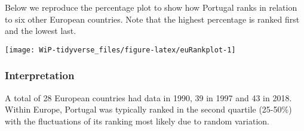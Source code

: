 \documentclass[a4paper,9pt,twocolumn,twoside,printwatermark=false]{pinp}
\begin{document}
Below we reproduce the percentage plot to show how Portugal ranks in
relation to six other European countries. Note that the highest
percentage is ranked first and the lowest last.

\begin{Shaded}
\end{Shaded}

\begin{center}\texttt{[image: WiP-tidyverse\_files/figure-latex/euRankplot-1]} \end{center}

\hypertarget{interpretation-4}{%
\subsubsection{Interpretation}\label{interpretation-4}}

A total of 28 European countries had data in 1990, 39 in 1997 and 43 in
2018. Within Europe, Portugal was typically ranked in the second
quartile (25-50\%) with the fluctuations of its ranking most likely due
to random variation.
\end{document}
